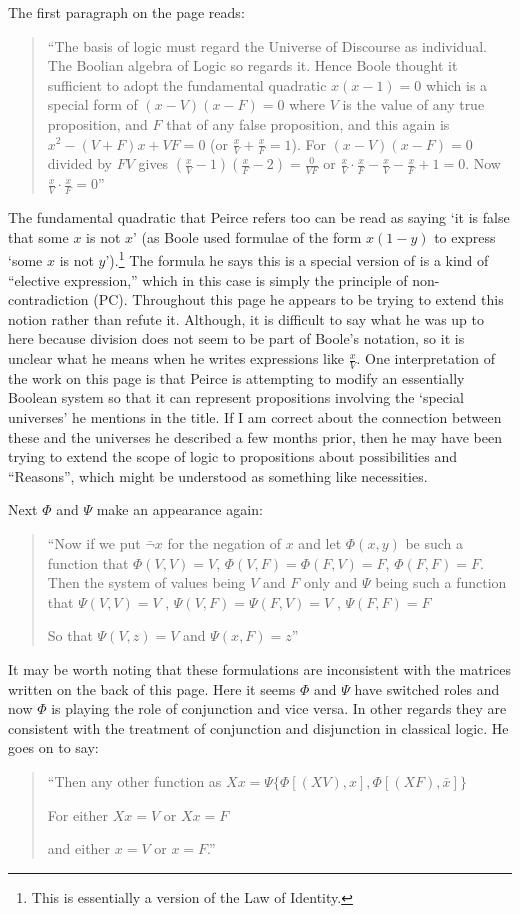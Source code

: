 The first paragraph on the page reads:
\begin{quotation}
\noindent``The basis of logic must regard the Universe of Discourse as individual. The Boolian algebra of Logic so regards it. Hence Boole thought it sufficient to adopt the fundamental quadratic $x(x-1)=0$ which is a special form of $(x-V)(x-F)=0$ where $V$ is the value of any true proposition, and $F$ that of any false proposition, and this again is $x^{2}-(V+F)x+VF=0$ (or $\frac{x}{V} +\frac{x}{F}=1$). For $(x-V)(x-F)=0$ divided by $FV$ gives $(\frac{x}{V} -1)(\frac{x}{F} -2)=\frac{0}{VF}$ or $\frac{x}{V} \cdot \frac{x}{F}-\frac{x}{V}-\frac{x}{F}+1=0$. Now $\frac{x}{V} \cdot \frac{x}{F}=0$''
\end{quotation}
\noindent The fundamental quadratic that Peirce refers too can be read as saying `it is false that some $x$ is not $x$' (as Boole used formulae of the form $x(1-y)$ to express `some $x$ is not $y$').\footnote{This is essentially a version of the Law of Identity.} The formula he says this is a special version of is a kind of ``elective expression,'' which in this case is simply the principle of non-contradiction (PC). Throughout this page he appears to be trying to extend this notion rather than refute it. Although, it is difficult to say what he was up to here because division does not seem to be part of Boole's notation, so it is unclear what he means when he writes expressions like $\frac{x}{V}$. One interpretation of the work on this page is that Peirce is attempting to modify an essentially Boolean system so that it can represent propositions involving the `special universes' he mentions in the title. If I am correct about the connection between these and the universes he described a few months prior, then he may have been trying to extend the scope of logic to propositions about possibilities and ``Reasons'', which might be understood as something like necessities.

Next $\Phi$ and $\Psi$ make an appearance again:
\begin{quotation}
``Now if we put $\bar{\lnot}x$ for the negation of $x$ and let $\Phi(x,y)$ be such a function that $\Phi(V,V)=V$, $\Phi(V,F)=\Phi(F,V)=F$, $\Phi(F,F)=F$. Then the system of values being $V$ and $F$ only and $\Psi$ being such a function that $\Psi(V, V)= V$ , $\Psi(V, F)=\Psi(F, V)=V$ , $\Psi(F, F)=F$

So that $\Psi(V, z)=V$ and $\Psi(x, F)= z$''
\end{quotation}
\noindent It may be worth noting that these formulations are inconsistent with the matrices written on the back of this page. Here it seems $\Phi$ and $\Psi$ have switched roles and now $\Phi$ is playing the role of conjunction and vice versa. In other regards they are consistent with the treatment of conjunction and disjunction in classical logic. He goes on to say:
\begin{quotation}
``Then any other function as $Xx=\Psi\{\Phi[(XV), x], \Phi[(XF),\bar{x}]\}$

For either $Xx=V$ or $Xx=F$

and either $x=V$ or $x=F$.''
\end{quotation}

